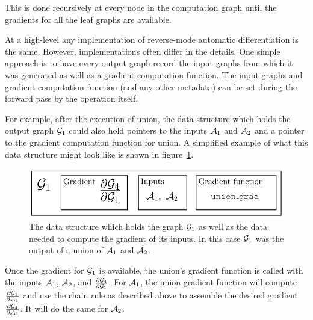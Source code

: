 This is done recursively at every node in the computation graph until the
gradients for all the leaf graphs are available.

At a high-level any implementation of reverse-mode automatic differentiation is
the same. However, implementations often differ in the details. One simple
approach is to have every output graph record the input graphs from which it
was generated as well as a gradient computation function. The input graphs and
gradient computation function (and any other metadata) can be set during the
forward pass by the operation itself.

For example, after the execution of union, the data structure which holds the
output graph $\mathcal{G}_1$ could also hold pointers to the inputs $\mathcal{A}_1$ and $\mathcal{A}_2$
and a pointer to the gradient computation function for union. A simplified
example of what this data structure might look like is shown in
figure~\ref{fig:grad_data}.

\begin{figure}
    \centering
    \includegraphics[scale=0.9]{figures/grad_data}
    \caption{The data structure which holds the graph $\mathcal{G}_1$ as well as the
    data needed to compute the gradient of its inputs. In this case $\mathcal{G}_1$ was
    the output of a union of $\mathcal{A}_1$ and $\mathcal{A}_2$.}
    \label{fig:grad_data}
\end{figure}

Once the gradient for $\mathcal{G}_1$ is available, the union's gradient function is
called with the inputs $\mathcal{A}_1$, $\mathcal{A}_2$, and $\frac{\partial \mathcal{G}_4}{\partial
\mathcal{G}_1}$. For $\mathcal{A}_1$, the union gradient function will compute $\frac{\partial
\mathcal{G}_1}{\partial \mathcal{A}_1}$ and use the chain rule as described above to assemble
the desired gradient $\frac{\partial \mathcal{G}_4}{\partial \mathcal{A}_1}$. It will do the
same for $\mathcal{A}_2$.
